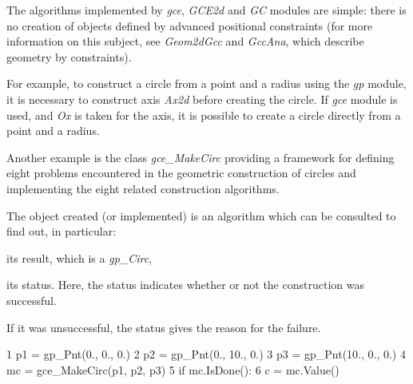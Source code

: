 The algorithms implemented by {\itshape gce}, {\itshape G\+C\+E2d} and {\itshape GC} modules are simple\+: there is no creation of objects defined by advanced positional constraints (for more information on this subject, see {\itshape Geom2d\+Gcc} and {\itshape Gcc\+Ana}, which describe geometry by constraints).

For example, to construct a circle from a point and a radius using the {\itshape gp} module, it is necessary to construct axis {\itshape Ax2d} before creating the circle. If {\itshape gce} module is used, and {\itshape Ox} is taken for the axis, it is possible to create a circle directly from a point and a radius.

Another example is the class {\itshape gce\+\_\+\+Make\+Circ} providing a framework for defining eight problems encountered in the geometric construction of circles and implementing the eight related construction algorithms.

The object created (or implemented) is an algorithm which can be consulted to find out, in particular\+:


\begin{DoxyItemize}
\item its result, which is a {\itshape gp\+\_\+\+Circ},
\item its status. Here, the status indicates whether or not the construction was successful.
\end{DoxyItemize}

If it was unsuccessful, the status gives the reason for the failure.


\begin{DoxyCode}
1 p1 = gp\_Pnt(0., 0., 0.)
2 p2 = gp\_Pnt(0., 10., 0.)
3 p3 = gp\_Pnt(10., 0., 0.)
4 mc = gce\_MakeCirc(p1, p2, p3)
5 \textcolor{keywordflow}{if} mc.IsDone():
6   c = mc.Value()
\end{DoxyCode}


